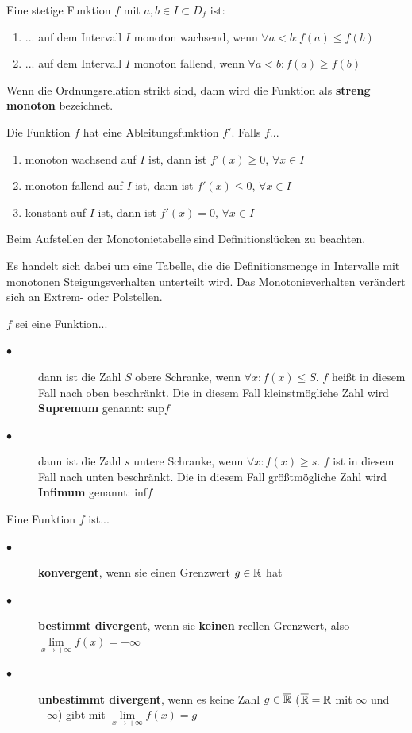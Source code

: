 \documentclass[main.tex]{subfiles}
\begin{document}
\begin{Definition}
	Eine stetige Funktion $f$ mit $a,b\in I \subset D_{f}$ ist:

	\begin{enumerate}
		\item ... auf dem Intervall $I$ monoton wachsend, wenn $\forall a < b: f(a)\leq f(b)$
		\item ... auf dem Intervall $I$ monoton fallend, wenn $\forall a < b: f(a) \geq f(b)$
	\end{enumerate}
	Wenn die Ordnungsrelation strikt sind, dann wird die Funktion als \textbf{streng monoton} bezeichnet.
	
	Die Funktion $f$ hat eine Ableitungsfunktion $f'$. Falls $f$...
	\begin{enumerate}
		\item monoton wachsend auf $I$ ist, dann ist $f'(x)\geq0$, \quad $\forall x \in I$
		\item monoton fallend auf $I$ ist, dann ist $f'(x)\leq0$, \quad $\forall x \in I$
		\item konstant auf $I$ ist, dann ist $f'(x)=0$, \quad $\forall x \in I$
	\end{enumerate}
	Beim Aufstellen der Monotonietabelle sind Definitionslücken zu beachten.
	
	Es handelt sich dabei um eine Tabelle, die die Definitionsmenge in Intervalle mit monotonen Steigungsverhalten unterteilt wird. Das Monotonieverhalten verändert sich an Extrem- oder Polstellen.
\end{Definition}

\begin{Bemerkung}
	$f$ sei eine Funktion...
	\begin{description}
		\item[$\bullet$] dann ist die Zahl $S$ obere Schranke, wenn $\forall x : f(x)\leq S$. $f$ heißt in diesem Fall nach oben beschränkt. Die in diesem Fall kleinstmögliche Zahl wird \textbf{Supremum} genannt: sup$f$
		\item[$\bullet$] dann ist die Zahl $s$ untere Schranke, wenn $\forall x : f(x) \geq s$. $f$ ist in diesem Fall nach unten beschränkt. Die in diesem Fall größtmögliche Zahl wird \textbf{Infimum} genannt: inf$f$
	\end{description}
\end{Bemerkung}

\begin{Bemerkung}
	Eine Funktion $f$ ist...
	\begin{description}
		\item[$\bullet$] \textbf{konvergent}, wenn sie einen Grenzwert $g\in\mathbb{R}$ hat
		\item[$\bullet$] \textbf{bestimmt divergent}, wenn sie  \textbf{keinen} reellen Grenzwert, also $\lim\limits_{x \rightarrow +\infty}{f(x)} = \pm \infty$
		\item[$\bullet$] \textbf{unbestimmt divergent}, wenn es keine Zahl $g\in\overline{\mathbb{R}}$ ($\overline{\mathbb{R}} = \mathbb{R}$ mit $\infty$ und $-\infty$) gibt mit $\lim\limits_{x \rightarrow +\infty}{f(x)} = g$
	\end{description}
\end{Bemerkung}
\end{document}
